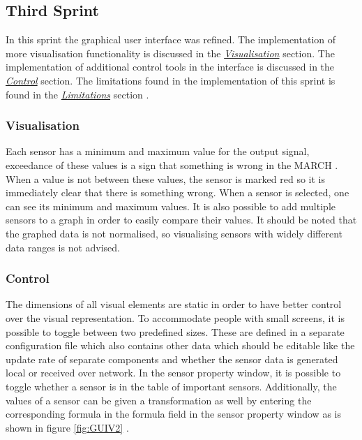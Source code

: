 \subsection{Third Sprint}
In this sprint the graphical user interface was refined. The implementation of more visualisation functionality is discussed in the \hyperref[sec:VisS3]{\textit{Visualisation}} section. The implementation of additional control tools in the interface is discussed in the \hyperref[sec:ConS3]{\textit{Control}} section. The limitations found in the implementation of this sprint is found in the \hyperref[sec:LimS3]{\textit{Limitations}} section .
\subsubsection{Visualisation}
\label{sec:VisS3}
Each sensor has a minimum and maximum value for the output signal, exceedance of these values is a sign that something is wrong in the MARCH . When a value is not between these values, the sensor is marked red so it is immediately clear that there is something wrong. When a sensor is selected, one can see its minimum and maximum values. It is also possible to add multiple sensors to a graph in order to easily compare their values. It should be noted that the graphed data is not normalised, so visualising sensors with widely different data ranges is not advised.  

\subsubsection{Control}
\label{sec:ConS3}
The dimensions of all visual elements are static in order to have better control over the visual representation. To accommodate people with small screens, it is possible to toggle between two predefined sizes. These are defined in a separate configuration file which also contains other data which should be editable like the update rate of separate components and whether the sensor data is generated local or received over network. In the sensor property window, it is possible to toggle whether a sensor is in the table of important sensors. Additionally, the values of a sensor can be given a transformation as well by entering the corresponding formula in the formula field in the sensor property window as is shown in figure \ref{fig:GUIV2} . 


